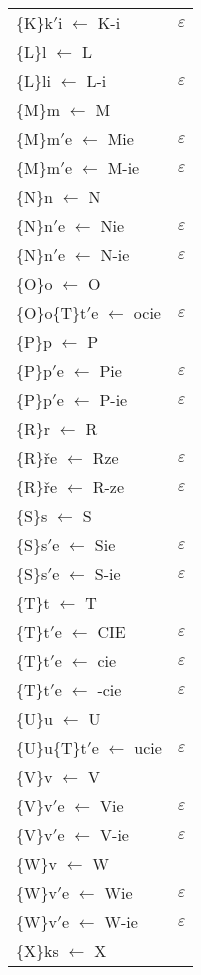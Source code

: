 \documentclass{article}
\begin{document}
\begin{longtable}{l|p{10cm}}
\{K\}k$'$i $\leftarrow$ K-i & $\varepsilon$\\
\{L\}l $\leftarrow$ L & \\
\{L\}li $\leftarrow$ L-i & $\varepsilon$\\
\{M\}m $\leftarrow$ M & \\
\{M\}m$'$e $\leftarrow$ Mie & $\varepsilon$\\
\{M\}m$'$e $\leftarrow$ M-ie & $\varepsilon$\\
\{N\}n $\leftarrow$ N & \\
\{N\}n$'$e $\leftarrow$ Nie & $\varepsilon$\\
\{N\}n$'$e $\leftarrow$ N-ie & $\varepsilon$\\
\{O\}o $\leftarrow$ O & \\
\{O\}o\{T\}t$'$e $\leftarrow$ ocie & $\varepsilon$\\
\{P\}p $\leftarrow$ P & \\
\{P\}p$'$e $\leftarrow$ Pie & $\varepsilon$\\
\{P\}p$'$e $\leftarrow$ P-ie & $\varepsilon$\\
\{R\}r $\leftarrow$ R & \\
\{R\}ře $\leftarrow$ Rze & $\varepsilon$\\
\{R\}ře $\leftarrow$ R-ze & $\varepsilon$\\
\{S\}s $\leftarrow$ S & \\
\{S\}s$'$e $\leftarrow$ Sie & $\varepsilon$\\
\{S\}s$'$e $\leftarrow$ S-ie & $\varepsilon$\\
\{T\}t $\leftarrow$ T & \\
\{T\}t$'$e $\leftarrow$ CIE & $\varepsilon$\\
\{T\}t$'$e $\leftarrow$ cie & $\varepsilon$\\
\{T\}t$'$e $\leftarrow$ -cie & $\varepsilon$\\
\{U\}u $\leftarrow$ U & \\
\{U\}u\{T\}t$'$e $\leftarrow$ ucie & $\varepsilon$\\
\{V\}v $\leftarrow$ V & \\
\{V\}v$'$e $\leftarrow$ Vie & $\varepsilon$\\
\{V\}v$'$e $\leftarrow$ V-ie & $\varepsilon$\\
\{W\}v $\leftarrow$ W & \\
\{W\}v$'$e $\leftarrow$ Wie & $\varepsilon$\\
\{W\}v$'$e $\leftarrow$ W-ie & $\varepsilon$\\
\{X\}ks $\leftarrow$ X & \\

\end{longtable}
\end{document}
